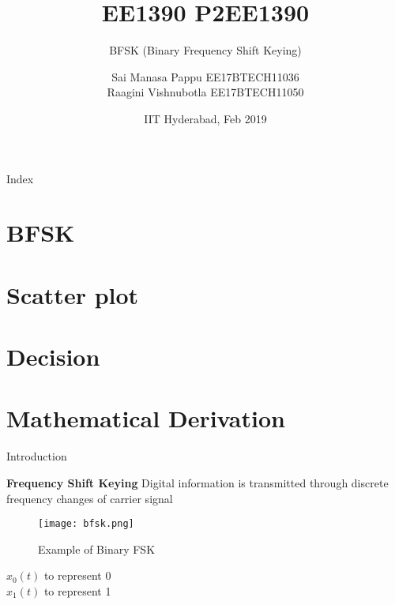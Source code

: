 \documentclass{beamer}
\title[Project]{EE1390 P2}
\title{EE1390}
\subtitle{BFSK (Binary Frequency Shift Keying)}
\author{Sai Manasa Pappu EE17BTECH11036 \\
        Raagini Vishnubotla EE17BTECH11050
   }
\date{IIT Hyderabad, Feb 2019}
\begin{document}
\begin{frame}
\titlepage 
\end{frame}


\begin{frame}{Index}
  \tableofcontents


\section{BFSK }
\section{Scatter plot}
\section{Decision}
\section{Mathematical Derivation}
\end{frame}

\begin{frame}{Introduction}
    \begin{block}{
    \textbf{Frequency Shift Keying}}
    \bigbreak
    Digital information is transmitted through discrete frequency changes of carrier signal \\
    \bigbreak
    \end{block}
\end{frame}

\begin{frame}
    
    \begin{figure}
        \centering
        \texttt{[image: bfsk.png]}
        \caption{Example of Binary FSK}
        \label{fig:m_label}
    \end{figure}
    $x_0(t)$ to represent 0 \\
    $x_1(t)$ to represent 1
\end{frame}
\end{document}
